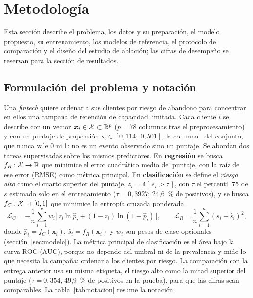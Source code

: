 \section{Metodología}
\label{sec:metodologia}

Esta sección describe el problema, los datos y su preparación, el modelo propuesto, su entrenamiento, los
modelos de referencia, el protocolo de comparación y el diseño del estudio de ablación; las cifras de
desempeño se reservan para la sección de resultados.

\subsection{Formulación del problema y notación}
\label{sec:formulacion}

Una \emph{fintech} quiere ordenar a sus clientes por riesgo de abandono para concentrar en ellos una campaña
de retención de capacidad limitada. Cada cliente $i$ se describe con un vector $\bm{x}_i \in \mathcal{X} \subset \mathbb{R}^{p}$
($p = 78$ columnas tras el preprocesamiento) y con un puntaje de propensión $s_i \in [0{,}114;\ 0{,}501]$, la
columna \cp\ del conjunto, que nunca vale 0 ni 1: no es un evento observado sino un puntaje. Se abordan dos
tareas supervisadas sobre los mismos predictores. En \textbf{regresión} se busca $f_R: \mathcal{X} \to \mathbb{R}$ que
minimice el error cuadrático medio del puntaje, con la raíz de ese error (RMSE) como métrica principal. En
\textbf{clasificación} se define el \emph{riesgo alto} como el cuarto superior del puntaje,
$z_i = \mathbb{1}[\,s_i > \tau\,]$, con $\tau$ el percentil 75 de $s$ estimado solo en el entrenamiento
($\tau = 0{,}3927$; 24,6~\% de positivos), y se busca $f_C: \mathcal{X} \to [0, 1]$ que minimice la entropía cruzada
ponderada
\begin{equation}
  \mathcal{L}_C = -\frac{1}{n}\sum_{i=1}^{n} w_i \big[\, z_i \ln \hat{p}_i + (1 - z_i) \ln (1 - \hat{p}_i) \,\big],
  \qquad
  \mathcal{L}_R = \frac{1}{n}\sum_{i=1}^{n} (s_i - \hat{s}_i)^2,
  \label{eq:perdidas}
\end{equation}
donde $\hat{p}_i = f_C(\bm{x}_i)$, $\hat{s}_i = f_R(\bm{x}_i)$ y $w_i$ son pesos de clase opcionales
(sección~\ref{sec:modelo}). La métrica principal de clasificación es el área bajo la curva ROC (AUC), porque
no depende del umbral ni de la prevalencia y mide lo que necesita la campaña: ordenar a los clientes por
riesgo. La comparación con la entrega anterior usa su misma etiqueta, el riesgo alto como la mitad superior
del puntaje ($\tau = 0{,}354$, 49,9~\% de positivos en la prueba), para que las cifras sean comparables. La
tabla~\ref{tab:notacion} resume la notación.

